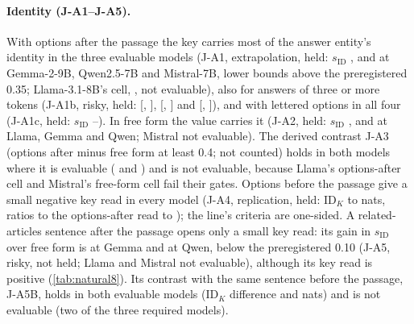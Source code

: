 \paragraph{Identity (J-A1--J-A5).} With options after the passage the key carries most of the answer entity's identity in the three evaluable models (J-A1, extrapolation, held: $s_{\mathrm{ID}}$ \JaSidOptaGemmaNine{}, \JaSidOptaQwenSeven{} and \JaSidOptaMistralSeven{} at Gemma-2-9B, Qwen2.5-7B and Mistral-7B, lower bounds above the preregistered 0.35; Llama-3.1-8B's cell, \JaSidOptaLlamaEight{}, not evaluable), also for answers of three or more tokens (J-A1b, risky, held: \JaOnebSidGemmaNine{} [\JaOnebSidGemmaNineLo{}, \JaOnebSidGemmaNineHi{}], \JaOnebSidQwenSeven{} [\JaOnebSidQwenSevenLo{}, \JaOnebSidQwenSevenHi{}] and \JaOnebSidMistralSeven{} [\JaOnebSidMistralSevenLo{}, \JaOnebSidMistralSevenHi{}]), and with lettered options in all four (J-A1c, held: $s_{\mathrm{ID}}$ \JaSidLetaLlamaEight{}--\JaSidLetaGemmaNine{}). In free form the value carries it (J-A2, held: $s_{\mathrm{ID}}$ \JaSidNomLlamaEight{}, \JaSidNomGemmaNine{} and \JaSidNomQwenSeven{} at Llama, Gemma and Qwen; Mistral not evaluable). The derived contrast J-A3 (options after minus free form at least 0.4; not counted) holds in both models where it is evaluable (\JaThreeDiffGemmaNine{} and \JaThreeDiffQwenSeven{}) and is not evaluable, because Llama's options-after cell and Mistral's free-form cell fail their gates. Options before the passage give a small negative key read in every model (J-A4, replication, held: $\mathrm{ID}_K$ \JaFourIDKOptbMin{} to \JaFourIDKOptbMax{} nats, ratios to the options-after read \JaFourRatioMin{} to \JaFourRatioMax{}); the line's criteria are one-sided. A related-articles sentence after the passage opens only a small key read: its gain in $s_{\mathrm{ID}}$ over free form is \JaFiveDiffGemmaNine{} at Gemma and \JaFiveDiffQwenSeven{} at Qwen, below the preregistered 0.10 (J-A5, risky, not held; Llama and Mistral not evaluable), although its key read is positive (\cref{tab:natural8}). Its contrast with the same sentence before the passage, J-A5B, holds in both evaluable models ($\mathrm{ID}_K$ difference \JaFiveBDiffGemmaNine{} and \JaFiveBDiffQwenSeven{} nats) and is not evaluable (two of the three required models).

